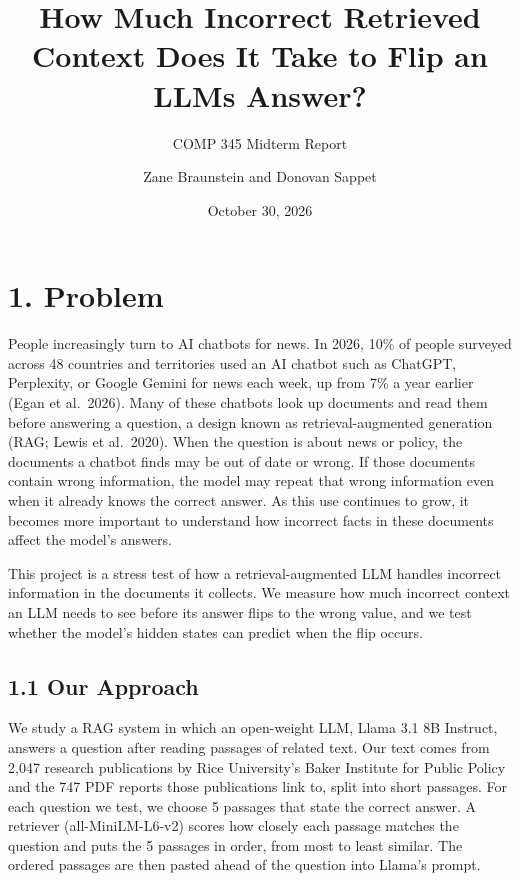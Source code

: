 \documentclass[
  12pt,
  letterpaper,
]{article}
\title{How Much Incorrect Retrieved Context Does
It Take to Flip an LLM\textquotesingle s Answer?}
\subtitle{COMP 345 Midterm Report}
\author{Zane Braunstein and Donovan Sappet}
\date{October 30, 2026}
\begin{document}
\maketitle

\section{1. Problem}\label{problem}

People increasingly turn to AI chatbots for news.
In 2026, 10\% of people surveyed across 48
countries and territories used an AI chatbot such
as ChatGPT, Perplexity, or Google Gemini for news
each week, up from 7\% a year earlier (Egan et
al.~2026). Many of these chatbots look up
documents and read them before answering a
question, a design known as retrieval-augmented
generation (RAG; Lewis et al.~2020). When the
question is about news or policy, the documents a
chatbot finds may be out of date or wrong. If
those documents contain wrong information, the
model may repeat that wrong information even when
it already knows the correct answer. As this use
continues to grow, it becomes more important to
understand how incorrect facts in these documents
affect the model's answers.

This project is a stress test of how a
retrieval-augmented LLM handles incorrect
information in the documents it collects. We
measure how much incorrect context an LLM needs to
see before its answer flips to the wrong value,
and we test whether the model's hidden states can
predict when the flip occurs.

\subsection{1.1 Our Approach}\label{our-approach}

We study a RAG system in which an open-weight LLM,
Llama 3.1 8B Instruct, answers a question after
reading passages of related text. Our text comes
from 2,047 research publications by Rice
University's Baker Institute for Public Policy and
the 747 PDF reports those publications link to,
split into short passages. For each question we
test, we choose 5 passages that state the correct
answer. A retriever (all-MiniLM-L6-v2) scores how
closely each passage matches the question and puts
the 5 passages in order, from most to least
similar. The ordered passages are then pasted
ahead of the question into Llama's prompt.
\end{document}
